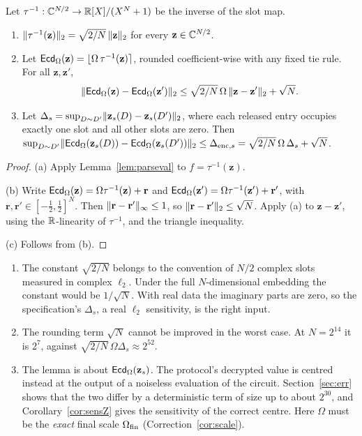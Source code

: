 \begin{lemma}\label{lem:enc}
Let $\tau^{-1}:\mathbb{C}^{N/2}\to\mathbb{R}[X]/(X^N+1)$ be the inverse of the slot map.
\begin{enumerate}[nosep,label=(\alph*)]
  \item $\lVert \tau^{-1}(\mathbf z)\rVert_2=\sqrt{2/N}\,\lVert \mathbf z\rVert_2$ for every $\mathbf z\in\mathbb{C}^{N/2}$.
  \item Let $\mathsf{Ecd}_\Omega(\mathbf z)=\lfloor\Omega\,\tau^{-1}(\mathbf z)\rceil$, rounded coefficient-wise with any fixed tie rule. For all $\mathbf z,\mathbf z'$,
  \[
    \lVert \mathsf{Ecd}_\Omega(\mathbf z)-\mathsf{Ecd}_\Omega(\mathbf z')\rVert_2\le\sqrt{2/N}\,\Omega\,\lVert \mathbf z-\mathbf z'\rVert_2+\sqrt N .
  \]
  \item Let $\Delta_s=\sup_{D\sim D'}\lVert \mathbf z_s(D)-\mathbf z_s(D')\rVert_2$, where each released entry occupies exactly one slot and all other slots are zero. Then $\sup_{D\sim D'}\lVert \mathsf{Ecd}_\Omega(\mathbf z_s(D))-\mathsf{Ecd}_\Omega(\mathbf z_s(D'))\rVert_2\le\Delta_{\mathrm{enc},s}=\sqrt{2/N}\,\Omega\,\Delta_s+\sqrt N$.
\end{enumerate}
\end{lemma}
\begin{proof}
(a) Apply Lemma~\ref{lem:parseval} to $f=\tau^{-1}(\mathbf z)$.

(b) Write $\mathsf{Ecd}_\Omega(\mathbf z)=\Omega\tau^{-1}(\mathbf z)+\mathbf r$ and $\mathsf{Ecd}_\Omega(\mathbf z')=\Omega\tau^{-1}(\mathbf z')+\mathbf r'$, with $\mathbf r,\mathbf r'\in[-\tfrac12,\tfrac12]^N$. Then $\lVert \mathbf r-\mathbf r'\rVert_\infty\le1$, so $\lVert \mathbf r-\mathbf r'\rVert_2\le\sqrt N$. Apply (a) to $\mathbf z-\mathbf z'$, using the $\mathbb{R}$-linearity of $\tau^{-1}$, and the triangle inequality.

(c) Follows from (b).
\end{proof}

\begin{remark}\label{rem:enc}
\begin{enumerate}[nosep,label=(\roman*)]
  \item The constant $\sqrt{2/N}$ belongs to the convention of $N/2$ complex slots measured in complex $\ell_2$. Under the full $N$-dimensional embedding the constant would be $1/\sqrt N$. With real data the imaginary parts are zero, so the specification's $\Delta_s$, a real $\ell_2$ sensitivity, is the right input.
  \item The rounding term $\sqrt N$ cannot be improved in the worst case. At $N=2^{14}$ it is $2^7$, against $\sqrt{2/N}\,\Omega\Delta_s\approx2^{52}$.
  \item The lemma is about $\mathsf{Ecd}_\Omega(\mathbf z_s)$. The protocol's decrypted value is centred instead at the output of a noiseless evaluation of the circuit. Section~\ref{sec:err} shows that the two differ by a deterministic term of size up to about $2^{30}$, and Corollary~\ref{cor:sensZ} gives the sensitivity of the correct centre. Here $\Omega$ must be the \emph{exact} final scale $\Omega_{\mathrm{fin}}$ (Correction~\ref{cor:scale}).
\end{enumerate}
\end{remark}

